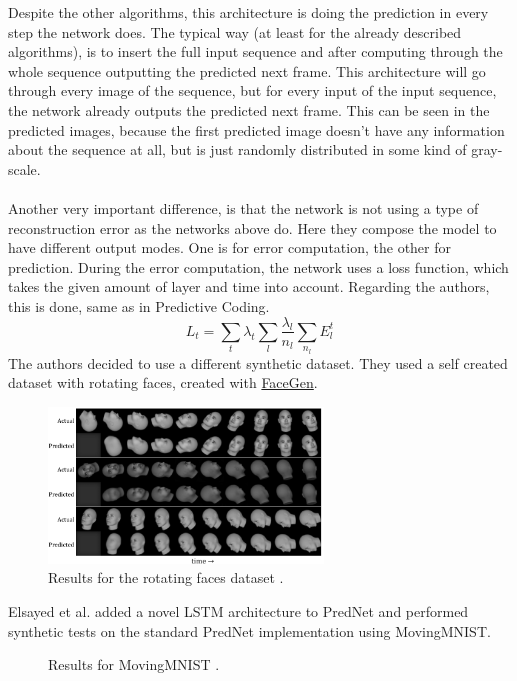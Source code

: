  Despite the other algorithms, this architecture is doing the prediction in every step the network does. The typical way (at least for the already described 
 algorithms), is to insert the full input sequence and after computing through the whole sequence outputting the predicted next frame. This architecture will go
 through every image of the sequence, but for every input of the input sequence, the network already outputs the predicted next frame. This can be seen in the
 predicted images, because the first predicted image doesn't have any information about the sequence at all, but is just randomly distributed in some
 kind of gray-scale.
 \\\\
 Another very important difference, is that the network is not using a type of reconstruction error as the networks above do. Here they compose the model to
 have different output modes. One is for error computation, the other for prediction. During the error computation, the network uses a loss function, which takes
 the given amount of layer and time into account. Regarding the authors, this is done, same as in Predictive Coding.
 \begin{equation}
  L_t = \sum_{t}\lambda_t \sum_l \frac{\lambda_l}{n_l} \sum_{n_l}E_l^t
 \end{equation}
 The authors decided to use a different synthetic dataset. They used a self created dataset with rotating faces, created with \href{https://facegen.com/}
 {FaceGen}.
 \begin{figure}[H]
   \includegraphics[width=0.65\textwidth]{../Images/prednet.png}
   \centering
   \caption{Results for the rotating faces dataset \cite{Lotter2016}.}
   \label{fig:lotter_rotation}
 \end{figure}\noindent
 Elsayed et al. \cite{Elsayed2018} added a novel LSTM architecture to PredNet and performed synthetic tests on the standard PredNet implementation
 using MovingMNIST.
 \begin{figure}[H]
   \centering
   \qquad
   \caption{Results for MovingMNIST \cite{Elsayed2018}.}
   \label{figure::elsayed_mnist}
  \end{figure}\noindent
 
